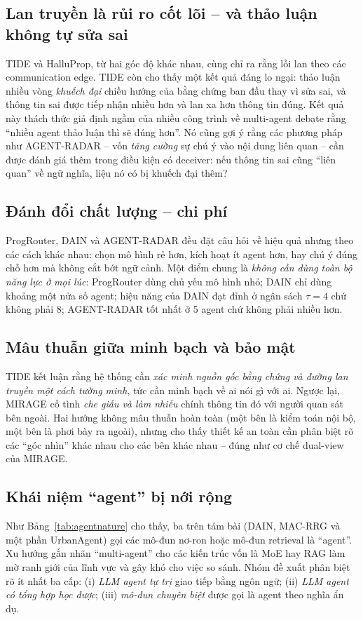 \subsection{Lan truyền là rủi ro cốt lõi -- và thảo luận không tự sửa sai}
TIDE và HalluProp, từ hai góc độ khác nhau, cùng chỉ ra rằng lỗi lan theo các communication edge. TIDE còn cho thấy một kết quả đáng lo ngại: thảo luận nhiều vòng \emph{khuếch đại} chiều hướng của bằng chứng ban đầu thay vì sửa sai, và thông tin sai được tiếp nhận nhiều hơn và lan xa hơn thông tin đúng. Kết quả này thách thức giả định ngầm của nhiều công trình về multi-agent debate rằng ``nhiều agent thảo luận thì sẽ đúng hơn''. Nó cũng gợi ý rằng các phương pháp như AGENT-RADAR -- vốn \emph{tăng cường} sự chú ý vào nội dung liên quan -- cần được đánh giá thêm trong điều kiện có deceiver: nếu thông tin sai cũng ``liên quan'' về ngữ nghĩa, liệu nó có bị khuếch đại thêm?

\subsection{Đánh đổi chất lượng -- chi phí}
ProgRouter, DAIN và AGENT-RADAR đều đặt câu hỏi về hiệu quả nhưng theo các cách khác nhau: chọn mô hình rẻ hơn, kích hoạt ít agent hơn, hay chú ý đúng chỗ hơn mà không cắt bớt ngữ cảnh. Một điểm chung là \emph{không cần dùng toàn bộ năng lực ở mọi lúc}: ProgRouter dùng chủ yếu mô hình nhỏ; DAIN chỉ dùng khoảng một nửa số agent; hiệu năng của DAIN đạt đỉnh ở ngân sách $\tau = 4$ chứ không phải $8$; AGENT-RADAR tốt nhất ở 5 agent chứ không phải nhiều hơn.

\subsection{Mâu thuẫn giữa minh bạch và bảo mật}
TIDE kết luận rằng hệ thống cần \emph{xác minh nguồn gốc bằng chứng và đường lan truyền một cách tường minh}, tức cần minh bạch về ai nói gì với ai. Ngược lại, MIRAGE cố tình \emph{che giấu và làm nhiễu} chính thông tin đó với người quan sát bên ngoài. Hai hướng không mâu thuẫn hoàn toàn (một bên là kiểm toán nội bộ, một bên là phơi bày ra ngoài), nhưng cho thấy thiết kế \MAS{} an toàn cần phân biệt rõ các ``góc nhìn'' khác nhau cho các bên khác nhau -- đúng như cơ chế dual-view của MIRAGE.

\subsection{Khái niệm ``agent'' bị nới rộng}
Như Bảng~\ref{tab:agentnature} cho thấy, ba trên tám bài (DAIN, MAC-RRG và một phần UrbanAgent) gọi các mô-đun nơ-ron hoặc mô-đun retrieval là ``agent''. Xu hướng gắn nhãn ``multi-agent'' cho các kiến trúc vốn là MoE hay RAG làm mờ ranh giới của lĩnh vực và gây khó cho việc so sánh. Nhóm đề xuất phân biệt rõ ít nhất ba cấp: (i) \emph{LLM agent tự trị} giao tiếp bằng ngôn ngữ; (ii) \emph{LLM agent có tổng hợp học được}; (iii) \emph{mô-đun chuyên biệt} được gọi là agent theo nghĩa ẩn dụ.

